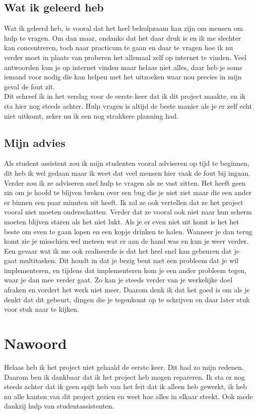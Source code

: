 \documentclass[12pt]{article}
\begin{document}
\subsection{Wat ik geleerd heb}
Wat ik geleerd heb, is vooral dat het heel behulpzaam kan zijn om mensen om hulp te vragen. Om dan maar, ondanks dat het daar druk is en ik me slechter kan concentreren, toch naar practicum te gaan en daar te vragen hoe ik nu verder moet in plaats van proberen het allemaal zelf op internet te vinden. Veel antwoorden kun je op internet vinden maar helaas niet alles, daar heb je soms iemand voor nodig die kan helpen met het uitzoeken waar nou precies in mijn geval de fout zit.\\
Dit schreef ik in het verslag voor de eerste keer dat ik dit project maakte, en ik sta hier nog steeds achter. Hulp vragen is altijd de beste manier als je er zelf echt niet uitkomt, zeker nu ik een nog strakkere planning had.
\subsection{Mijn advies}
Als student assistent zou ik mijn studenten vooral adviseren op tijd te beginnen, dit heb ik wel gedaan maar ik weet dat veel mensen hier vaak de fout bij ingaan. Verder zou ik ze adviseren snel hulp te vragen als ze vast zitten. Het heeft geen zin om je hoofd te blijven breken over een bug die je niet ziet maar die een ander er binnen een paar minuten uit heeft. Ik zal ze ook vertellen dat ze het project vooral niet moeten onderschatten. Verder dat ze vooral ook niet naar hun scherm moeten blijven staren als het niet lukt. Als je er even niet uit komt is het het beste om even te gaan lopen en een kopje drinken te halen. Wanneer je dan terug komt zie je misschien wel meteen wat er aan de hand was en kun je weer verder.\\
Een gevaar wat ik me ook realiseerde is dat het heel snel kan gebeuren dat je gaat multitasken. Dit houdt in dat je bezig bent met een probleem dat je wil implementeren, en tijdens dat implementeren kom je een ander probleem tegen, waar je dan mee verder gaat. Zo kan je steeds verder van je werkelijke doel afraken en vordert het werk niet meer. Daarom denk ik dat het goed is om als je denkt dat dit gebeurt, dingen die je tegenkomt op te schrijven en daar later stuk voor stuk naar te kijken.
\section{Nawoord}
Helaas heb ik het project niet gehaald de eerste keer. Dit had zo mijn redenen. Daarom ben ik dankbaar dat ik het project heb mogen repareren. Ik sta er nog steeds achter dat ik geen spijt heb van het feit dat ik alleen heb gewerkt, ik heb nu alle kanten van dit project gezien en weet hoe alles in elkaar steekt. Ook mede dankzij hulp van studentassistenten. 
\end{document}
